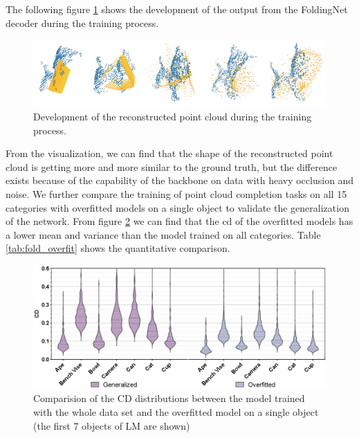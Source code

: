 \documentclass[12pt,DIV14,BCOR12mm,a4paper,footinclude=false,headinclude,parskip=half-,twoside,openright,cleardoublepage=empty,toc=index,bibliography=totoc,listof=totoc]{scrreprt}
\numberwithin{equation}{chapter}
\begin{document}
The following figure \ref{img:fold_dev} shows the development of the output from the FoldingNet decoder during the training process.

\begin{figure}[h]
	\centering
	\includegraphics[width=1.\textwidth]{img/fold_dev.pdf}
	\caption{Development of the reconstructed point cloud during the training process.}
	\label{img:fold_dev}
\end{figure}

From the visualization, we can find that the shape of the reconstructed point cloud is getting more and more similar to the ground truth, but the difference exists because of the capability of the backbone on data with heavy occlusion and noise. We further compare the training of point cloud completion tasks on all 15 categories with overfitted models on a single object to validate the generalization of the network. From figure \ref{img:fold_overfit} we can find that the \gls{cd} of the overfitted models has a lower mean and variance than the model trained on all categories. Table \ref{tab:fold_overfit} shows the quantitative comparison.
\begin{figure}[h]
	\centering
	\includegraphics[width=1.\textwidth]{img/fold_overfit.eps}
	\caption{Comparision of the CD distributions between the model trained with the whole data set and the overfitted model on a single object (the first 7 objects of LM are shown)}
	\label{img:fold_overfit}
\end{figure}
\end{document}
